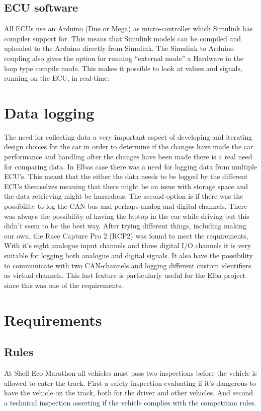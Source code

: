 \subsection{ECU software}
All ECUs use an Arduino (Due or Mega) as micro-controller which Simulink has
compiler support for. This means that Simulink models can be compiled and
uploaded to the Arduino directly from Simulink. The Simulink to Arduino coupling also
gives the option for running ``external mode'' a Hardware in the loop type compile mode.
This makes it possible to look at values and signals, running on the ECU, in
real-time.

\section{Data logging}
The need for collecting data a very important aspect of developing and
iterating design choices for the car in order to determine if the changes have
made the car performance and handling after the changes have been made there
is a real need for comparing data. In Elbas case there was a need for logging
data from multiple ECU's. This meant that the either the data needs to be logged
by the different ECUs themselves meaning that there might be an issue with
storage space and the data retrieving might be hazardous. The second option is
if there was the possibility to log the CAN-bus and perhaps analog and digital
channels. There was always the possibility of having the laptop in the car while
driving but this didn't seem to be the best way. After trying different things,
including making our own, the Race Capture Pro 2 (RCP2) was found to meet the
requirements, %
With it's eight analogue input channels and
three digital I/O channels it is very suitable for logging both analogue and
digital signals. It also have the possibility to communicate with two
CAN-channels and logging different custom identifiers as virtual channels. This
last feature is particularly useful for the Elba project since this was one of
the requirements.

\section{Requirements}
\subsection{Rules}
At Shell Eco Marathon all vehicles must pass two inspections before the vehicle
is allowed to enter the track. First a safety inspection evaluating if it's
dangerous to have the vehicle on the track, both for the driver and other
vehicles. And second a technical inspection asserting if the vehicle complies
with the competition rules.

